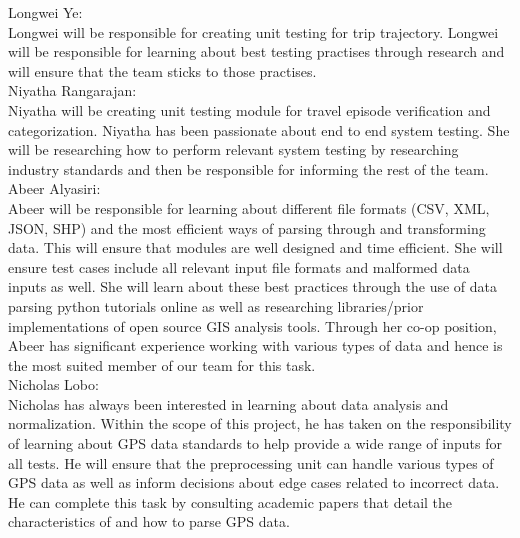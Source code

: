 \documentclass[12pt, titlepage]{article}
\begin{document}
\noindent Longwei Ye:\\
Longwei will be responsible for creating unit testing for trip trajectory. Longwei will be responsible for learning about best testing practises through research and will ensure that the team sticks to those practises.\\

\noindent Niyatha Rangarajan:\\
Niyatha will be creating unit testing module for travel episode verification and categorization. Niyatha has been passionate about end to end system testing. She will be researching how to perform relevant system testing by researching industry standards and then be responsible for informing the rest of the team.\\

\noindent Abeer Alyasiri:\\ Abeer will be responsible for learning about different file formats (CSV, XML, JSON, SHP) and the most efficient ways of parsing through and transforming data. This will ensure that modules are well designed and time efficient. She will ensure test cases include all relevant input file formats and malformed data inputs as well. She will learn about these best practices through the use of data parsing python tutorials online as well as researching libraries/prior implementations of open source GIS analysis tools. Through her co-op position, Abeer has significant experience working with various types of data and hence is the most suited member of our team for this task.   \\

\noindent Nicholas Lobo: \\
Nicholas has always been interested in learning about data analysis and normalization. Within the scope of this project, he has taken on the responsibility of learning about GPS data standards to help provide a wide range of inputs for all tests. He will ensure that the preprocessing unit can handle various types of GPS data as well as inform decisions about edge cases related to incorrect data. He can complete this task by consulting academic papers that detail the characteristics of and how to parse GPS data.\\
\end{document}
